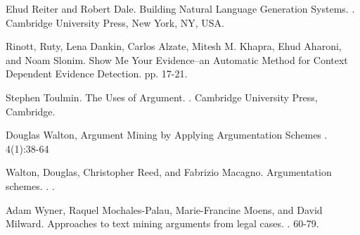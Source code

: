 \documentclass[11pt]{article}
\begin{document}
\begin{thebibliography}{}
Ehud Reiter and Robert Dale. Building Natural Language Generation Systems. 
. 
\newblock Cambridge University Press, New York, NY, USA.

Rinott, Ruty, Lena Dankin, Carlos Alzate, Mitesh M. Khapra, Ehud Aharoni, and Noam Slonim. Show Me Your Evidence–an Automatic Method for Context Dependent Evidence Detection.
 pp. 17-21.

Stephen Toulmin. The Uses of Argument.
.
\newblock Cambridge University Press, Cambridge.

Douglas Walton, Argument Mining by Applying Argumentation Schemes
.
 4(1):38-64

Walton, Douglas, Christopher Reed, and Fabrizio Macagno. Argumentation schemes. 
.
.

Adam Wyner, Raquel Mochales-Palau, Marie-Francine Moens, and David Milward. Approaches to text mining arguments from legal cases. 
.
 60-79.


\end{thebibliography}
\end{document}
